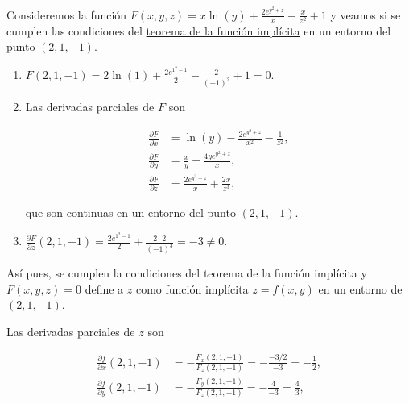 \documentclass[
  spanish,
  a4paper,
]{scrreport}
\theoremstyle{definition}
\theoremstyle{remark}
\begin{document}
\begin{tcolorbox}[enhanced jigsaw, arc=.35mm, bottomrule=.15mm, bottomtitle=1mm, breakable, colback=white, colbacktitle=quarto-callout-tip-color!10!white, colframe=quarto-callout-tip-color-frame, coltitle=black, left=2mm, leftrule=.75mm, opacityback=0, opacitybacktitle=0.6, rightrule=.15mm, title=\textcolor{quarto-callout-tip-color}{\faLightbulb}\hspace{0.5em}{Solución}, titlerule=0mm, toprule=.15mm, toptitle=1mm]

Consideremos la función
\(F(x,y,z) = x\ln(y)+\frac{2e^{y^2+z}}{x} - \frac{x}{z^2} + 1\) y veamos
si se cumplen las condiciones del
\href{https://aprendeconalf.es/analisis-manual/13-derivadas-funciones-varias-variables.html\#thm-funcion-implicita}{teorema
de la función implícita} en un entorno del punto \((2,1,-1)\).

\begin{enumerate}
\def\labelenumi{\alph{enumi}.}
\item
  \(F(2,1,-1) = 2\ln(1)+\frac{2e^{1^2-1}}{2}-\frac{2}{(-1)^2}+1 = 0\).
\item
  Las derivadas parciales de \(F\) son

  \begin{align*}
  \frac{\partial F}{\partial x} 
  &= \ln(y) - \frac{2e^{y^2+z}}{x^2} - \frac{1}{z^2}, \\
  \frac{\partial F}{\partial y} 
  &= \frac{x}{y} - \frac{4ye^{y^2+z}}{x}, \\
  \frac{\partial F}{\partial z} 
  &= \frac{2e^{y^2+z}}{x} + \frac{2x}{z^3},  
  \end{align*}

  que son continuas en un entorno del punto \((2,1,-1)\).
\item
  \(\frac{\partial F}{\partial z}(2,1,-1) = \frac{2e^{1^2-1}}{2} + \frac{2\cdot 2}{(-1)^3} = -3 \neq 0\).
\end{enumerate}

Así pues, se cumplen la condiciones del teorema de la función implícita
y \(F(x,y,z)=0\) define a \(z\) como función implícita \(z=f(x,y)\) en
un entorno de \((2,1,-1)\).

Las derivadas parciales de \(z\) son

\begin{align*}
\frac{\partial f}{\partial x} (2,1,-1)
&= -\frac{F_x(2,1,-1)}{F_z(2,1,-1)} = -\frac{-3/2}{-3} = -\frac{1}{2},\\
\frac{\partial f}{\partial y} (2,1,-1)
&= -\frac{F_y(2,1,-1)}{F_z(2,1,-1)} = -\frac{4}{-3} = \frac{4}{3},
\end{align*}


\end{tcolorbox}
\end{document}
